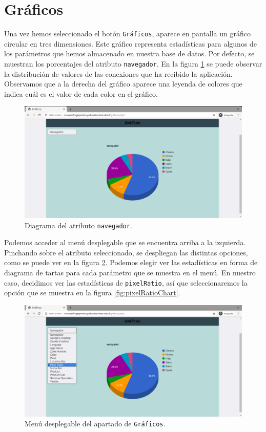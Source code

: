 \section{Gráficos}

Una vez hemos seleccionado el botón \texttt{Gráficos}, aparece en pantalla un gráfico circular en tres dimensiones. 
Este gráfico representa estadísticas para algunos de los parámetros que hemos almacenado en nuestra base de datos. Por defecto, se muestran los porcentajes del atributo \texttt{navegador}. En la figura \ref{fig:navegadorChart} se puede observar la distribución de valores de las conexiones que ha recibido la aplicación. Observamos que a la derecha del gráfico aparece una leyenda de colores que indica cuál es el valor de cada color en el gráfico. 

\begin{figure}[tbp]
	\centering
	\includegraphics[width=1\textwidth]{Images/navegadorChart.png}
	\caption{Diagrama del atributo \texttt{navegador}.}
	\label{fig:navegadorChart}
\end{figure}

Podemos acceder al menú desplegable que se encuentra arriba a la izquierda. Pinchando sobre el atributo seleccionado, se despliegan las distintas opciones, como se puede ver en la figura \ref{fig:menuChart}. Podemos elegir ver las estadísticas en forma de diagrama de tartas para cada parámetro que se muestra en el menú. En nuestro caso, decidimos ver las estadísticas de \texttt{pixelRatio}, así que seleccionaremos la opción que se muestra en la figura \ref{fig:pixelRatioChart}.

\begin{figure}[tbp]
	\centering
	\includegraphics[width=1\textwidth]{Images/menuChart.png}
	\caption{Menú desplegable del apartado de \texttt{Gráficos}.}
	\label{fig:menuChart}
\end{figure}

